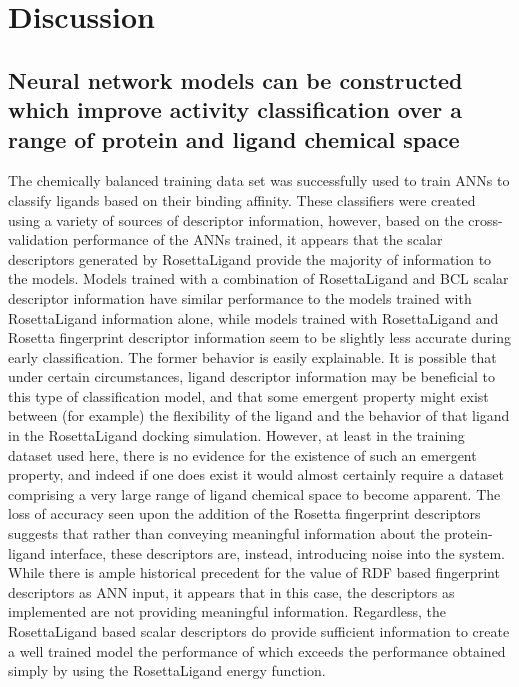 \section{Discussion}

\subsection{Neural network models can be constructed which improve activity classification over a range of protein and ligand chemical space}

The chemically balanced training data set was successfully used to train \ac{ANN}s to classify ligands based on their binding affinity.
These classifiers were created using a variety of sources of descriptor information, however, based on the cross-validation performance of the \ac{ANN}s trained, it appears that the scalar descriptors generated by RosettaLigand provide the majority of information to the models.
Models trained with a combination of RosettaLigand and \ac{BCL} scalar descriptor information have similar performance to the models trained with RosettaLigand information alone, while models trained with RosettaLigand and Rosetta fingerprint descriptor information seem to be slightly less accurate during early classification.
The former behavior is easily explainable.
It is possible that under certain circumstances, ligand descriptor information may be beneficial to this type of classification model, and that some emergent property might exist between (for example) the flexibility of the ligand and the behavior of that ligand in the RosettaLigand docking simulation.
However, at least in the training dataset used here, there is no evidence for the existence of such an emergent property, and indeed if one does exist it would almost certainly require a dataset comprising a very large range of ligand chemical space to become apparent. 
The loss of accuracy seen upon the addition of the Rosetta fingerprint descriptors suggests that rather than conveying meaningful information about the protein-ligand interface, these descriptors are, instead, introducing noise into the system.
While there is ample historical precedent \citep{Mueller:2010dx,Butkiewicz:2013ka,Hristozov:2007bz} for the value of \ac{RDF} based fingerprint descriptors as \ac{ANN} input, it appears that in this case, the descriptors as implemented are not providing meaningful information.
Regardless, the RosettaLigand based scalar descriptors do provide sufficient information to create a well trained model the performance of which exceeds the performance obtained simply by using the RosettaLigand energy function. 

